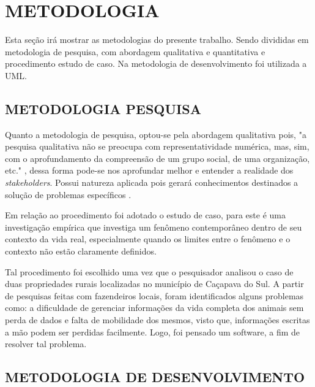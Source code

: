 %
%



\section{METODOLOGIA}

Esta seção irá mostrar as metodologias do presente trabalho. Sendo divididas em metodologia de pesquisa, com abordagem qualitativa e quantitativa e procedimento estudo de caso. Na metodologia de desenvolvimento foi utilizada a UML.

\subsection{METODOLOGIA PESQUISA}

Quanto a metodologia de pesquisa, optou-se pela abordagem qualitativa pois, "a pesquisa qualitativa não se preocupa com representatividade numérica, mas, sim, com o aprofundamento da compreensão de um grupo social, de uma organização, etc."  \cite{ufrgs09}, dessa forma pode-se nos aprofundar melhor e entender a realidade dos \emph{stakeholders}. Possui natureza aplicada pois gerará conhecimentos destinados a solução de problemas específicos \cite{ufrgs09} .

Em relação ao procedimento foi adotado o estudo de caso, para  este é uma investigação empírica que investiga um fenômeno contemporâneo dentro de seu contexto da vida real, especialmente quando os limites entre o fenômeno e o contexto não estão claramente definidos.

Tal procedimento foi  escolhido uma vez que o pesquisador analisou o caso de duas propriedades rurais localizadas no município de Caçapava do Sul. A partir de pesquisas  feitas com fazendeiros locais, foram identificados alguns problemas como: a dificuldade de gerenciar informações da vida completa dos animais sem perda de  dados e falta de mobilidade dos mesmos, visto que, informações escritas a mão podem ser perdidas facilmente. Logo, foi pensado um software, a fim de resolver tal problema.

\subsection{METODOLOGIA DE DESENVOLVIMENTO}

